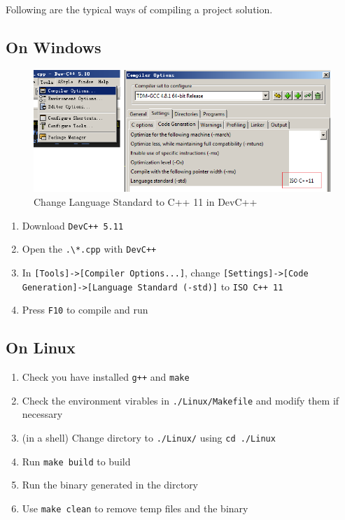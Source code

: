 \documentclass[cn,black,12pt,normal]{elegantnote}
\begin{document}
Following are the typical ways of compiling a project solution.

\subsection{On Windows}

\begin{figure}[H]
    \centering
    \includegraphics[width=1.0\linewidth]{image/dev02.png}
    \caption{Change Language Standard to C++ 11 in DevC++}
\end{figure}

\begin{enumerate}
    \item Download \lstinline{DevC++ 5.11}
    \item Open the \lstinline{.\*.cpp} with \lstinline{DevC++}
    \item In \lstinline{[Tools]->[Compiler Options...]}, change \lstinline{[Settings]->[Code Generation]->[Language Standard (-std)]} to \lstinline{ISO C++ 11}
    \item Press \lstinline{F10} to compile and run
\end{enumerate}



\subsection{On Linux}

\begin{enumerate}
    \item Check you have installed \lstinline{g++} and \lstinline{make}
    \item Check the environment virables in \lstinline{./Linux/Makefile} and modify them if necessary
    \item (in a shell) Change dirctory to \lstinline{./Linux/} using \lstinline{cd ./Linux}
    \item Run \lstinline{make build} to build
    \item Run the binary generated in the dirctory
    \item Use \lstinline{make clean} to remove temp files and the binary
\end{enumerate}
\end{document}
